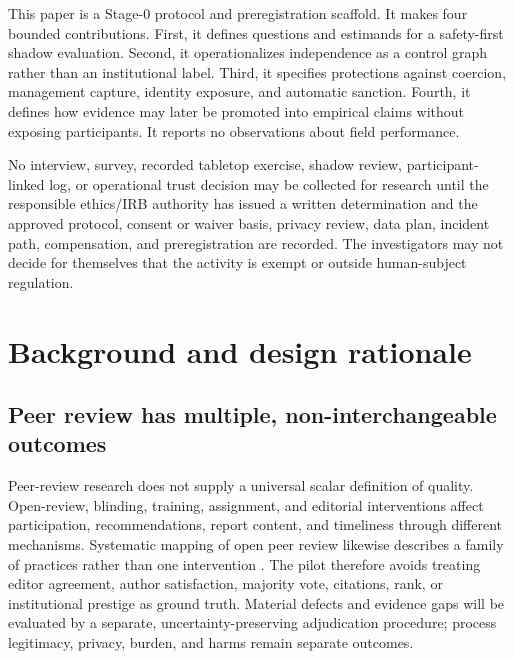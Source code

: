 \documentclass[11pt]{article}
\begin{document}

This paper is a Stage-0 protocol and preregistration scaffold. It makes four bounded
contributions. First, it defines questions and estimands for a safety-first shadow
evaluation. Second, it operationalizes independence as a control graph rather than
an institutional label. Third, it specifies protections against coercion,
management capture, identity exposure, and automatic sanction. Fourth, it defines
how evidence may later be promoted into empirical claims without exposing
participants. It reports no observations about field performance.

\begin{evidencegate}
No interview, survey, recorded tabletop exercise, shadow review, participant-linked
log, or operational trust decision may be collected for research until the
responsible ethics/IRB authority has issued a written determination and the approved
protocol, consent or waiver basis, privacy review, data plan, incident path,
compensation, and preregistration are recorded. The investigators may not decide
for themselves that the activity is exempt or outside human-subject regulation.
\end{evidencegate}

\section{Background and design rationale}

\subsection{Peer review has multiple, non-interchangeable outcomes}

Peer-review research does not supply a universal scalar definition of quality.
Open-review, blinding, training, assignment, and editorial interventions affect
participation, recommendations, report content, and timeliness through different
mechanisms. Systematic mapping of open peer review likewise describes a family of
practices rather than one intervention \citep{rosshellauer2017open}. The pilot
therefore avoids treating editor agreement, author satisfaction, majority vote,
citations, rank, or institutional prestige as ground truth. Material defects and
evidence gaps will be evaluated by a separate, uncertainty-preserving adjudication
procedure; process legitimacy, privacy, burden, and harms remain separate outcomes.
\end{document}

